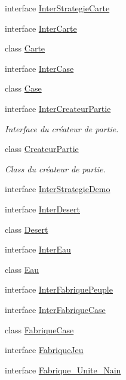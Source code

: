 \begin{DoxyCompactItemize}
\item 
interface \hyperlink{interface_small_world_1_1_inter_strategie_carte}{Inter\-Strategie\-Carte}
\item 
interface \hyperlink{interface_small_world_1_1_inter_carte}{Inter\-Carte}
\item 
class \hyperlink{class_small_world_1_1_carte}{Carte}
\item 
interface \hyperlink{interface_small_world_1_1_inter_case}{Inter\-Case}
\item 
class \hyperlink{class_small_world_1_1_case}{Case}
\item 
interface \hyperlink{interface_small_world_1_1_inter_createur_partie}{Inter\-Createur\-Partie}
\begin{DoxyCompactList}\small\item\em Interface du créateur de partie. \end{DoxyCompactList}\item 
class \hyperlink{class_small_world_1_1_createur_partie}{Createur\-Partie}
\begin{DoxyCompactList}\small\item\em Class du créateur de partie. \end{DoxyCompactList}\item 
interface \hyperlink{interface_small_world_1_1_inter_strategie_demo}{Inter\-Strategie\-Demo}
\item 
interface \hyperlink{interface_small_world_1_1_inter_desert}{Inter\-Desert}
\item 
class \hyperlink{class_small_world_1_1_desert}{Desert}
\item 
interface \hyperlink{interface_small_world_1_1_inter_eau}{Inter\-Eau}
\item 
class \hyperlink{class_small_world_1_1_eau}{Eau}
\item 
interface \hyperlink{interface_small_world_1_1_inter_fabrique_peuple}{Inter\-Fabrique\-Peuple}
\item 
interface \hyperlink{interface_small_world_1_1_inter_fabrique_case}{Inter\-Fabrique\-Case}
\item 
class \hyperlink{class_small_world_1_1_fabrique_case}{Fabrique\-Case}
\item 
interface \hyperlink{interface_small_world_1_1_fabrique_jeu}{Fabrique\-Jeu}
\item 
interface \hyperlink{interface_small_world_1_1_fabrique___unite___nain}{Fabrique\-\_\-\-Unite\-\_\-\-Nain}
\item 

\end{DoxyCompactItemize}
